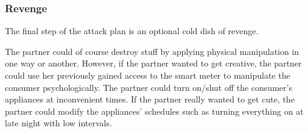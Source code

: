 \subsubsection{Revenge}
The final step of the attack plan is an optional cold dish of revenge.

The partner could of course destroy stuff by applying physical manipulation in one way or another.
However, if the partner wanted to get creative, the partner could use her previously gained access to the smart meter to manipulate the consumer psychologically.
The partner could turn on/shut off the consumer's appliances at inconvenient times.
If the partner really wanted to get cute, the partner could modify the appliances' schedules such as turning everything on at late night with low intervals.
